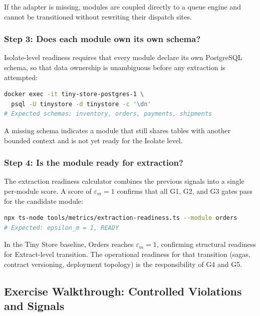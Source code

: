 \noindent
If the adapter is missing, modules are coupled directly to a queue engine and cannot be transitioned without rewriting their dispatch sites.

\subsubsection*{Step 3: Does each module own its own schema?}

Isolate-level readiness requires that every module declare its own PostgreSQL schema, so that data ownership is unambiguous before any extraction is attempted:

\begin{lstlisting}[basicstyle=\ttfamily\scriptsize,language=bash,caption={List PostgreSQL schemas declared by Tiny Store modules},label={lst:g3-tut-step3}]
docker exec -it tiny-store-postgres-1 \
  psql -U tinystore -d tinystore -c '\dn'
# Expected schemas: inventory, orders, payments, shipments
\end{lstlisting}

\noindent
A missing schema indicates a module that still shares tables with another bounded context and is not yet ready for the Isolate level.

\subsubsection*{Step 4: Is the module ready for extraction?}

The extraction readiness calculator combines the previous signals into a single per-module score. A score of $\varepsilon_m = 1$ confirms that all G1, G2, and G3 gates pass for the candidate module:

\begin{lstlisting}[basicstyle=\ttfamily\scriptsize,language=bash,caption={Run the extraction readiness calculator for the Orders module},label={lst:g3-tut-step4}]
npx ts-node tools/metrics/extraction-readiness.ts --module orders
# Expected: epsilon_m = 1, READY
\end{lstlisting}

\noindent
In the Tiny Store baseline, Orders reaches $\varepsilon_m = 1$, confirming structural readiness for Extract-level transition. The operational readiness for that transition (sagas, contract versioning, deployment topology) is the responsibility of G4 and G5.

\subsection*{Exercise Walkthrough: Controlled Violations and Signals}

